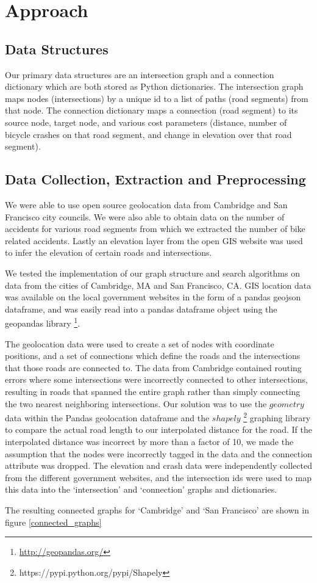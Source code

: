 \documentclass[11pt]{article}
\begin{document}
\section{Approach}
\subsection{Data Structures}
Our primary data structures are an intersection graph and a connection dictionary which are both stored as Python dictionaries. The intersection graph maps nodes (intersections) by a unique id to a list of paths (road segments) from that node. The connection dictionary maps a connection (road segment) to its source node, target node, and various cost parameters (distance, number of bicycle crashes on that road segment, and change in elevation over that road segment).

\subsection{Data Collection, Extraction and Preprocessing}
We were able to use open source geolocation data from Cambridge and San Francisco city councils. We were also able to obtain data on the number of accidents for various road segments from which we extracted the number of bike related accidents. Lastly an elevation layer from the open GIS website was used to infer the elevation of certain roads and intersections.

We tested the implementation of our graph structure and search algorithms on data from the cities of Cambridge, MA and San Francisco, CA. GIS location data was available on the local government websites in the form of a pandas geojson dataframe, and was easily read into a pandas dataframe object using the geopandas library \footnote{\url{http://geopandas.org/}}.
\par
The geolocation data were used to create a set of nodes with coordinate positions, and a set of connections which define the roads and the intersections that those roads are connected to. The data from Cambridge contained routing errors where some intersections were incorrectly connected to other intersections, resulting in roads that spanned the entire graph rather than simply connecting the two nearest neighboring intersections. Our solution was to use the $geometry$ data within the Pandas geolocation dataframe and the $shapely$ \footnote{https://pypi.python.org/pypi/Shapely} graphing library to compare the actual road length to our interpolated distance for the road. If the interpolated distance was incorrect by more than a factor of 10, we made the assumption that the nodes were incorrectly tagged in the data and the connection attribute was dropped. The elevation and crash data were independently collected from the different government websites, and the intersection ids were used to map this data into the `intersection' and `connection' graphs and dictionaries.
\par The resulting connected graphs for `Cambridge' and `San Francisco' are shown in figure \ref{connected_graphs}
\end{document}
